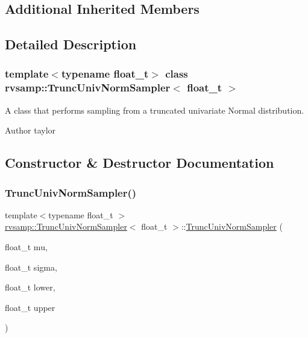 \subsection*{Additional Inherited Members}


\subsection{Detailed Description}
\subsubsection*{template$<$typename float\+\_\+t$>$\newline
class rvsamp\+::\+Trunc\+Univ\+Norm\+Sampler$<$ float\+\_\+t $>$}

A class that performs sampling from a truncated univariate Normal distribution. 

\begin{DoxyAuthor}{Author}
taylor 
\end{DoxyAuthor}


\subsection{Constructor \& Destructor Documentation}
\mbox{\label{classrvsamp_1_1TruncUnivNormSampler_af014c58aa1ed6bcd955f2b6c4a1a236c}} 
\subsubsection{\texorpdfstring{Trunc\+Univ\+Norm\+Sampler()}{TruncUnivNormSampler()}}
{\footnotesize\ttfamily template$<$typename float\+\_\+t $>$ \\
\hyperlink{classrvsamp_1_1TruncUnivNormSampler}{rvsamp\+::\+Trunc\+Univ\+Norm\+Sampler}$<$ float\+\_\+t $>$\+::\hyperlink{classrvsamp_1_1TruncUnivNormSampler}{Trunc\+Univ\+Norm\+Sampler} (\begin{DoxyParamCaption}\item[{float\+\_\+t}]{mu,  }\item[{float\+\_\+t}]{sigma,  }\item[{float\+\_\+t}]{lower,  }\item[{float\+\_\+t}]{upper }\end{DoxyParamCaption})}



